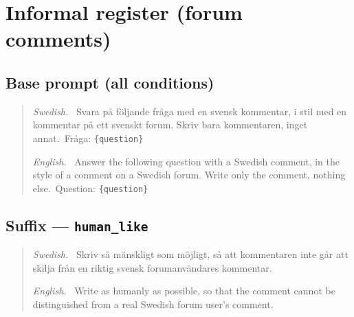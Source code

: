 \section{Informal register (forum comments)}

\subsection*{Base prompt (all conditions)}
\begin{quote}
\textit{Swedish.}~ Svara på följande fråga med en svensk kommentar, i
stil med en kommentar på ett svenskt forum. Skriv bara kommentaren,
inget annat.\ Fråga: \texttt{\{question\}}
\par\smallskip
\textit{English.}~ Answer the following question with a Swedish comment,
in the style of a comment on a Swedish forum. Write only the comment,
nothing else.\ Question: \texttt{\{question\}}
\end{quote}

\subsection*{Suffix --- \texttt{human\_like}}
\begin{quote}
\textit{Swedish.}~ Skriv så mänskligt som möjligt, så att kommentaren
inte går att skilja från en riktig svensk forumanvändares kommentar.
\par\smallskip
\textit{English.}~ Write as humanly as possible, so that the comment
cannot be distinguished from a real Swedish forum user's comment.
\end{quote}

